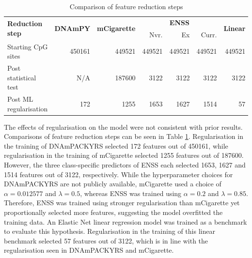 \documentclass{article} %
\begin{document}
\begin{table}
    \caption{Comparison of feature reduction steps} \label{table:sites-used}
    \begin{tabularx}{\textwidth}{X r r r r r r}
        \toprule
        \multirow{2}{*}{\textbf{Reduction step}} & \multirow{2}{*}{\textbf{DNAmPY}} & \multirow{2}{*}{\textbf{mCigarette}} & \multicolumn{3}{c}{\textbf{ENSS}} & \multirow{2}{*}{\textbf{Linear}}                               \\
        \cmidrule(lr){4-6}
                                                 &                                  &                                      & Nvr.                              & Ex                               & Curr.        &              \\
        \midrule
        Starting CpG sites                       & \num{450161}                     & \num{449521}                         & \num{449521}                      & \num{449521}                     & \num{449521} & \num{449521} \\
        \addlinespace
        Post statistical test                    & N/A                              & \num{187600}                         & \num{3122}                        & \num{3122}                       & \num{3122}   & \num{3122}   \\
        \addlinespace
        Post ML regularisation                   & \num{172}                        & \num{1255}                           & \num{1653}                        & \num{1627}                       & \num{1514}   & \num{57}     \\
        \bottomrule
    \end{tabularx}
\end{table}

The effects of regularisation on the model were not consistent with prior results. Comparisons of feature reduction steps can be seen in Table \ref{table:sites-used}. Regularisation in the training of DNAmPACKYRS selected 172 features out of \num{450161}, while regularisation in the training of mCigarette selected \num{1255} features out of \num{187600}. However, the three class-specific predictors of ENSS each selected 1653, 1627 and 1514 features out of 3122, respectively. While the hyperparameter choices for DNAmPACKYRS are not publicly available, mCigarette used a choice of \(\alpha = 0.012577\) and \(\lambda = 0.5\), whereas ENSS was trained using \(\alpha = 0.2\) and \(\lambda = 0.85\). Therefore, ENSS was trained using stronger regularisation than mCigarette yet proportionally selected more features, suggesting the model overfitted the training data. An Elastic Net linear regression model was trained as a benchmark to evaluate this hypothesis. Regularisation in the training of this linear benchmark selected 57 features out of 3122, which is in line with the regularisation seen in DNAmPACKYRS and mCigarette.
\end{document}
